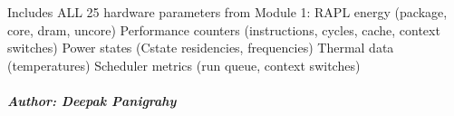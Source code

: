 \documentclass[letterpaper,10pt,english]{sphinxmanual}
\begin{document}
\sphinxAtStartPar
Includes ALL 25 hardware parameters from Module 1:
\sphinxhyphen{} RAPL energy (package, core, dram, uncore)
\sphinxhyphen{} Performance counters (instructions, cycles, cache, context switches)
\sphinxhyphen{} Power states (C\sphinxhyphen{}state residencies, frequencies)
\sphinxhyphen{} Thermal data (temperatures)
\sphinxhyphen{} Scheduler metrics (run queue, context switches)


\subparagraph{Author: Deepak Panigrahy}
\label{\detokenize{core.models.derived_energy_measurement:author-deepak-panigrahy}}

\begin{fulllineitems}
\label{\detokenize{core.models.derived_energy_measurement:core.models.derived_energy_measurement.DerivedEnergyMeasurement}}
\pysigstartsignatures
\pysiglinewithargsret
{}

\end{fulllineitems}
\end{document}
